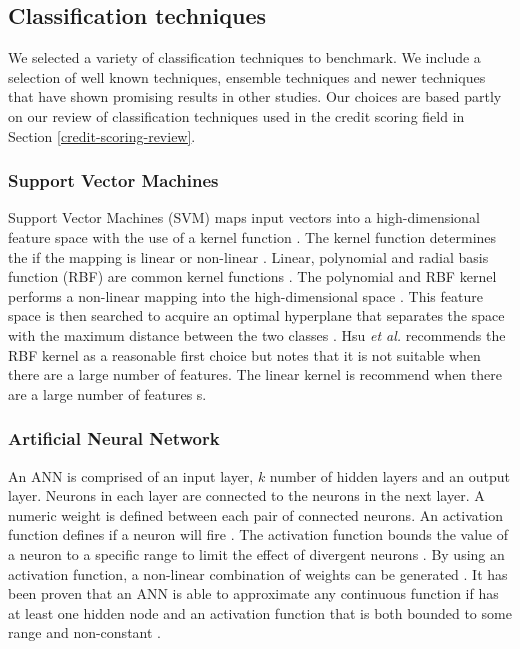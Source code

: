 \documentclass{sig-alternate-05-2015}
\begin{document}
	\subsection{Classification techniques}
	We selected a variety of classification techniques to benchmark. We include a selection of well known techniques, ensemble techniques and newer techniques that have shown promising results in other studies. Our choices are based partly on our review of classification techniques used in the credit scoring field in Section \ref{credit-scoring-review}.
	\subsubsection{Support Vector Machines}
	Support Vector Machines (SVM) maps input vectors into a high-dimensional feature space with the use of a kernel function \cite{Danenas20153194}. The kernel function determines the if the mapping is linear or non-linear \cite{Luo20097562}. Linear, polynomial and radial basis function (RBF) are common kernel functions \cite{hsu2003practical}. The polynomial and RBF kernel performs a non-linear mapping into the high-dimensional space \cite{hsu2003practical}. This feature space is then searched to acquire an optimal hyperplane that separates the space with the maximum distance between the two classes \cite{Danenas20153194}. Hsu \textit{et al.} \cite{hsu2003practical} recommends the RBF kernel as a reasonable first choice but notes that it is not suitable when there are a large number of features. The linear kernel is recommend when there are a large number of features \cite{hsu2003practical}s.
	
	\subsubsection{Artificial Neural Network}
	An ANN is comprised of an input layer, $k$ number of hidden layers and an output layer. Neurons in each layer are connected to the neurons in the next layer. A numeric weight is defined between each pair of connected neurons. An activation function defines if a neuron will fire \cite{Wang2003}. The activation function bounds the value of a neuron to a specific range to limit the effect of divergent neurons \cite{Wang2003}. By using an activation function, a non-linear combination of weights can be generated \cite{Wang2003}. It has been proven that an ANN is able to approximate any continuous function if has at least one hidden node and an activation function that is both bounded to some range and non-constant \cite{Hornik1991251}.
	
\end{document}
